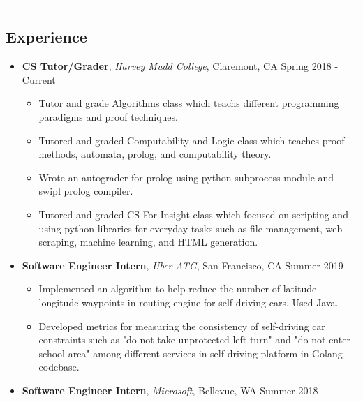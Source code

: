 \documentclass[10pt,letterpaper]{article}
\begin{document}
\hrule
\vspace{-0.95em}
\subsection*{Experience}
  \begin{itemize}
    \parskip=-0.45em
    \item[]
    {\textbf{CS Tutor/Grader}, \textit{Harvey Mudd College}, Claremont, CA \hfill {Spring 2018 - Current}}
    \begin{itemize}[label=\textbullet]
      \itemsep0.1em
      \item Tutor and grade Algorithms class which teachs different programming paradigms and proof techniques.
      \item Tutored and graded Computability and Logic class which teaches proof methods, automata, prolog,
      and computability theory. 
      \item Wrote an autograder for prolog using python subprocess module and swipl prolog compiler.
      \item Tutored and graded CS For Insight class which focused 
      on scripting and using python libraries for everyday tasks such as file management, web-scraping, 
      machine learning, and HTML generation.
    \end{itemize}
    \vspace{0.1em}
    \item[]
    {\textbf{Software Engineer Intern}, \textit{Uber ATG}, San Francisco, CA \hfill {Summer 2019}}
    \begin{itemize}[label=\textbullet]
      \itemsep0.1em
      \item Implemented an algorithm to help reduce the number of
      latitude-longitude waypoints in routing engine for self-driving cars. Used Java.
      \item Developed metrics for measuring the consistency of self-driving car constraints such as
      "do not take unprotected left turn" and "do not enter school area" among different services in 
      self-driving platform in Golang codebase.
    \end{itemize}
    \vspace{0.1em}
    \item[]
    {\textbf{Software Engineer Intern}, \textit{Microsoft}, Bellevue, WA \hfill {Summer 2018}}

\end{itemize}
\end{document}
